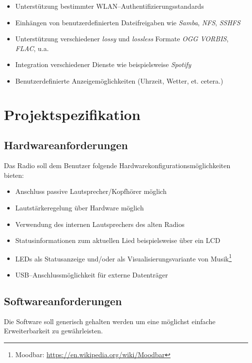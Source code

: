 \documentclass[11pt,ngerman,toc=listof,index=totoc]{scrreprt}
\providecommand{\tightlist}{%
  \setlength{\itemsep}{0pt}\setlength{\parskip}{0pt}}
\begin{document}
\begin{itemize}
\tightlist
\item
  Unterstützung bestimmter WLAN--Authentifizierungsstandards
\item
  Einhängen von benutzerdefinierten Dateifreigaben wie \emph{Samba},
  \emph{NFS}, \emph{SSHFS}
\item
  Unterstützung verschiedener \emph{lossy} und \emph{lossless} Formate
  \emph{OGG VORBIS}, \emph{FLAC}, u.a.
\item
  Integration verschiedener Dienste wie beispielsweise \emph{Spotify}
\item
  Benutzerdefinierte Anzeigemöglichkeiten (Uhrzeit, Wetter, et. cetera.)
\end{itemize}

\chapter{Projektspezifikation}\label{projektspezifikation}

\section{Hardwareanforderungen}\label{hardwareanforderungen}

Das Radio soll dem Benutzer folgende Hardwarekonfigurationsmöglichkeiten
bieten:

\begin{itemize}
\tightlist
\item
  Anschluss passive Lautsprecher/Kopfhörer möglich
\item
  Lautstärkeregelung über Hardware möglich
\item
  Verwendung des internen Lautsprechers des alten Radios
\item
  Statusinformationen zum aktuellen Lied beispielsweise über ein LCD
\item
  LEDs als Statusanzeige und/oder als Visualisierungsvariante von
  Musik\footnote{Moodbar: \url{https://en.wikipedia.org/wiki/Moodbar}}
\item
  USB--Anschlussmöglichkeit für externe Datenträger
\end{itemize}

\section{Softwareanforderungen}\label{softwareanforderungen}

Die Software soll generisch gehalten werden um eine möglichst einfache
Erweiterbarkeit zu gewährleisten.
\end{document}
